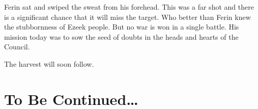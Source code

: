 Ferin sat and swiped the sweat from his forehead. This was a far shot and there is a significant chance that it will miss the target. Who better than Ferin knew the stubbornness of Ezeek people. But no war is won in a single battle. His mission today was to sow the seed of doubts in the heads and hearts of the Council.

The harvest will soon follow.


\section{To Be Continued\dots}